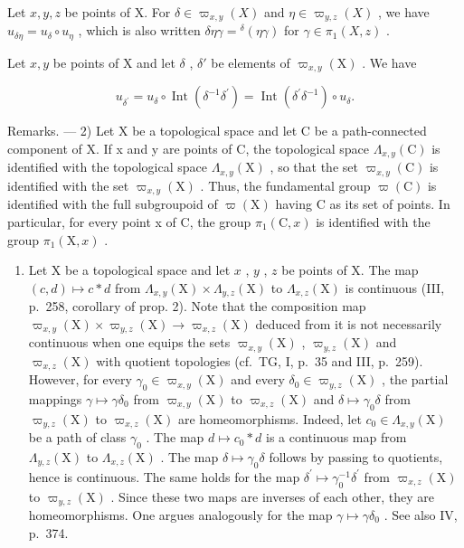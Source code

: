 Let \(x, y, z\) be points of X. For \(\delta \in \varpi_{x,y}(X)\) and \(\eta \in \varpi_{y,z}(X)\) , we have \(u_{\delta \eta} = u_{\delta} \circ u_{\eta}\) , which is also written \(\delta \eta \gamma = {}^{\delta}(\eta \gamma)\) for \(\gamma \in \pi_1(X, z)\) .

Let \(x, y\) be points of X and let \(\delta\) , \(\delta'\) be elements of \(\varpi_{x,y}(\mathrm{X})\) . We have

\[
u _ {\delta^ {\prime}} = u _ {\delta} \circ \operatorname{Int} (\delta^ {- 1} \delta^ {\prime}) = \operatorname{Int} (\delta^ {\prime} \delta^ {- 1}) \circ u _ {\delta}.\tag{7}
\]

Remarks. --- 2) Let X be a topological space and let C be a path-connected component of X. If x and y are points of C, the topological space \(\Lambda_{x,y}(\mathrm{C})\) is identified with the topological space \(\Lambda_{x,y}(\mathrm{X})\) , so that the set \(\varpi_{x,y}(\mathrm{C})\) is identified with the set \(\varpi_{x,y}(\mathrm{X})\) . Thus, the fundamental group \(\varpi(\mathrm{C})\) is identified with the full subgroupoid of \(\varpi(\mathrm{X})\) having C as its set of points. In particular, for every point x of C, the group \(\pi_1(\mathrm{C}, x)\) is identified with the group \(\pi_1(\mathrm{X}, x)\) .

\begin{enumerate}
\def\labelenumi{\arabic{enumi})}
\setcounter{enumi}{2}
\tightlist
\item
  Let X be a topological space and let \(x\) , \(y\) , \(z\) be points of X. The map \((c,d)\mapsto c*d\) from \(\Lambda_{x,y}(\mathrm{X})\times \Lambda_{y,z}(\mathrm{X})\) to \(\Lambda_{x,z}(\mathrm{X})\) is continuous (III, p.~258, corollary of prop. 2). Note that the composition map \(\varpi_{x,y}(\mathrm{X})\times \varpi_{y,z}(\mathrm{X})\to \varpi_{x,z}(\mathrm{X})\) deduced from it is not necessarily continuous when one equips the sets \(\varpi_{x,y}(\mathrm{X})\) , \(\varpi_{y,z}(\mathrm{X})\) and \(\varpi_{x,z}(\mathrm{X})\) with quotient topologies (cf.~TG, I, p.~35 and III, p.~259). However, for every \(\gamma_0\in \varpi_{x,y}(\mathrm{X})\) and every \(\delta_0\in \varpi_{y,z}(\mathrm{X})\) , the partial mappings \(\gamma \mapsto \gamma \delta_0\) from \(\varpi_{x,y}(\mathrm{X})\) to \(\varpi_{x,z}(\mathrm{X})\) and \(\delta \mapsto \gamma_0\delta\) from \(\varpi_{y,z}(\mathrm{X})\) to \(\varpi_{x,z}(\mathrm{X})\) are homeomorphisms. Indeed, let \(c_0\in \Lambda_{x,y}(\mathrm{X})\) be a path of class \(\gamma_0\) . The map \(d\mapsto c_0*d\) is a continuous map from \(\Lambda_{y,z}(\mathrm{X})\) to \(\Lambda_{x,z}(\mathrm{X})\) . The map \(\delta \mapsto \gamma_0\delta\) follows by passing to quotients, hence is continuous. The same holds for the map \(\delta^{\prime}\mapsto \gamma_{0}^{-1}\delta^{\prime}\) from \(\varpi_{x,z}(\mathrm{X})\) to \(\varpi_{y,z}(\mathrm{X})\) . Since these two maps are inverses of each other, they are homeomorphisms. One argues analogously for the map \(\gamma \mapsto \gamma \delta_0\) . See also IV, p.~374.
\end{enumerate}

